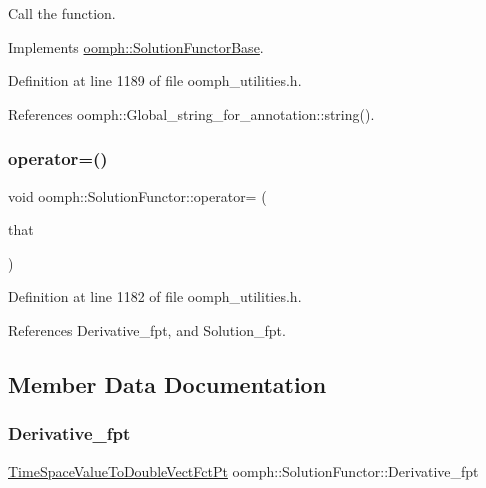 Call the function. 



Implements \hyperlink{classoomph_1_1SolutionFunctorBase_ad7177a415b2ef72f89b69dc68028166d}{oomph\+::\+Solution\+Functor\+Base}.



Definition at line 1189 of file oomph\+\_\+utilities.\+h.



References oomph\+::\+Global\+\_\+string\+\_\+for\+\_\+annotation\+::string().

\mbox{\label{classoomph_1_1SolutionFunctor_a7ac79a73917fc149efad11d6a26e29f5}} 
\subsubsection{\texorpdfstring{operator=()}{operator=()}}
{\footnotesize\ttfamily void oomph\+::\+Solution\+Functor\+::operator= (\begin{DoxyParamCaption}\item[{const \hyperlink{classoomph_1_1SolutionFunctor}{Solution\+Functor} \&}]{that }\end{DoxyParamCaption})\hspace{0.3cm}{\ttfamily [inline]}}



Definition at line 1182 of file oomph\+\_\+utilities.\+h.



References Derivative\+\_\+fpt, and Solution\+\_\+fpt.



\subsection{Member Data Documentation}
\mbox{\label{classoomph_1_1SolutionFunctor_a7ebbf961369283ab1f9a0cf54c841e46}} 
\subsubsection{\texorpdfstring{Derivative\+\_\+fpt}{Derivative\_fpt}}
{\footnotesize\ttfamily \hyperlink{classoomph_1_1SolutionFunctorBase_aca237d543e590a388b771aea22d3aad6}{Time\+Space\+Value\+To\+Double\+Vect\+Fct\+Pt} oomph\+::\+Solution\+Functor\+::\+Derivative\+\_\+fpt}



